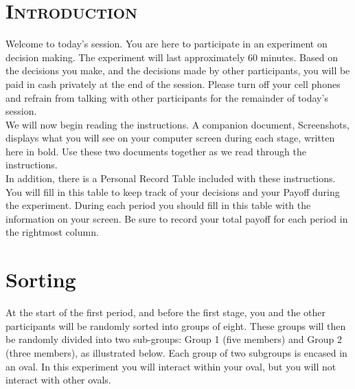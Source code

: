 \documentclass[12pt]{article}
\begin{document}
\section*{\scshape Introduction}

\thispagestyle{empty}


Welcome to today's session. You are here to participate in an experiment on decision making. The experiment will last approximately 60 minutes. Based on the decisions you make, and the decisions made by other participants, you will be paid in cash privately at the end of the session.  Please turn off your cell phones and refrain from talking with other participants for the remainder of today's session.\\ 

We will now begin reading the instructions.  A companion document, Screenshots, displays what you will see on your computer screen during each stage, written here in bold. Use these two documents together as we read through the instructions.\\ 

In addition, there is a Personal Record Table included with these instructions.  You will fill in this table to keep track of your decisions and your Payoff during the experiment. During each period you should fill in this table with the information on your screen. Be sure to record your total payoff for each period in the rightmost column.\\

\section*{Sorting}

At the start of the first period, and before the first stage, you and the other participants will be randomly sorted into groups of eight. These groups will then be randomly divided into two sub-groups: Group 1 (five members) and Group 2 (three members), as illustrated below. Each group of two subgroups is encased in an oval.  In this experiment you will interact within your oval, but you will not interact with other ovals.

\end{document}
